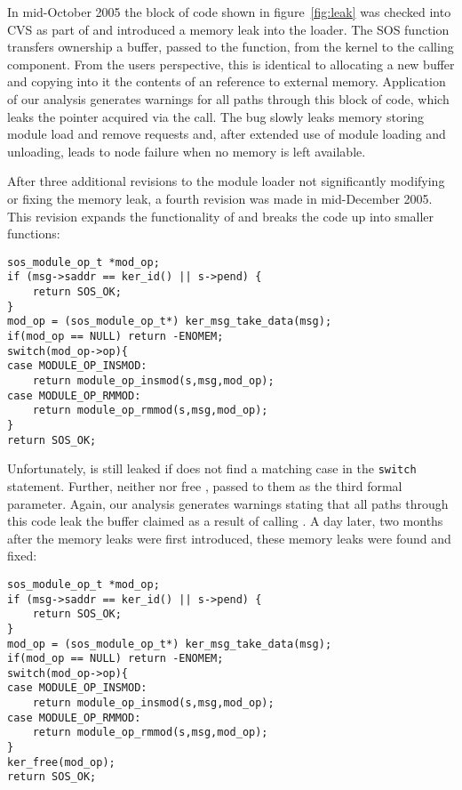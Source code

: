 In mid-October 2005 the block of code shown in figure~\ref{fig:leak} was
checked into CVS as part of  and introduced a memory leak into
the loader.  
%
The SOS function  transfers ownership a buffer,
passed to the function, from the kernel to the calling component.
%
From the users perspective, this is identical to allocating a new buffer and
copying into it the contents of an reference to external memory.
%
Application of our analysis generates warnings for all paths through this
block of code, which leaks the  pointer acquired via the
 call.  
%
The bug slowly leaks memory storing module load and remove requests and, after
extended use of module loading and unloading, leads to node failure when no
memory is left available.



After three additional revisions to the module loader not significantly
modifying or fixing the memory leak, a fourth revision was made in
mid-December 2005.  
%
This revision expands the functionality of  and breaks the code
up into smaller functions:



\begin{footnotesize}
\begin{verbatim}
sos_module_op_t *mod_op;
if (msg->saddr == ker_id() || s->pend) {
    return SOS_OK;
}
mod_op = (sos_module_op_t*) ker_msg_take_data(msg);
if(mod_op == NULL) return -ENOMEM;
switch(mod_op->op){
case MODULE_OP_INSMOD:
    return module_op_insmod(s,msg,mod_op);
case MODULE_OP_RMMOD:
    return module_op_rmmod(s,msg,mod_op);
}
return SOS_OK;
\end{verbatim}
\end{footnotesize}



Unfortunately,  is still leaked if  does not
find a matching case in the {\tt switch} statement.
%
Further, neither  nor  free
, passed to them as the third formal parameter.
%
Again, our analysis generates warnings stating that all paths through this
code leak the buffer claimed as a result of calling
.
%
A day later, two months after the memory leaks were first introduced, these
memory leaks were found and fixed:



\begin{footnotesize}
\begin{verbatim}
sos_module_op_t *mod_op;
if (msg->saddr == ker_id() || s->pend) {
    return SOS_OK;
}
mod_op = (sos_module_op_t*) ker_msg_take_data(msg);
if(mod_op == NULL) return -ENOMEM;
switch(mod_op->op){
case MODULE_OP_INSMOD:
    return module_op_insmod(s,msg,mod_op);
case MODULE_OP_RMMOD:
    return module_op_rmmod(s,msg,mod_op);
}
ker_free(mod_op);
return SOS_OK;
\end{verbatim}
\end{footnotesize}



